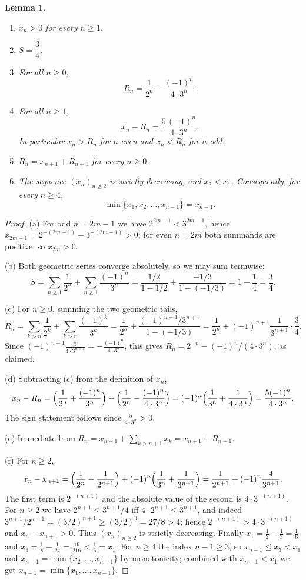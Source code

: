 \documentclass{amsart}
\newtheorem{lemma}{Lemma}
\theoremstyle{definition}
\begin{document}
\begin{lemma}\label{lem:setup}
\begin{enumerate}
\item[(a)] $x_n>0$ for every $n\ge1$.
\item[(b)] $S=\dfrac34$.
\item[(c)] For all $n\ge0$,
\[
  R_n=\frac{1}{2^n}-\frac{(-1)^n}{4\cdot3^n}.
\]
\item[(d)] For all $n\ge1$,
\[
  x_n-R_n=\frac{5\,(-1)^n}{4\cdot3^n}.
\]
In particular $x_n>R_n$ for $n$ even and $x_n<R_n$ for $n$ odd.
\item[(e)] $R_{n}=x_{n+1}+R_{n+1}$ for every $n\ge0$.
\item[(f)] The sequence $(x_n)_{n\ge2}$ is strictly decreasing, and $x_3<x_1$. Consequently, for
every $n\ge4$,
\[
  \min\{x_1,x_2,\dots,x_{n-1}\}=x_{n-1}.
\]
\end{enumerate}
\end{lemma}

\begin{proof}
(a) For odd $n=2m-1$ we have $2^{2m-1}<3^{2m-1}$, hence
$x_{2m-1}=2^{-(2m-1)}-3^{-(2m-1)}>0$; for even $n=2m$ both summands are positive, so $x_{2m}>0$.

(b) Both geometric series converge absolutely, so we may sum termwise:
\[
  S=\sum_{n\ge1}\frac1{2^n}+\sum_{n\ge1}\frac{(-1)^n}{3^n}
   =\frac{1/2}{1-1/2}+\frac{-1/3}{1-(-1/3)}
   =1-\frac14=\frac34 .
\]

(c) For $n\ge0$, summing the two geometric tails,
\[
  R_n=\sum_{k>n}\frac1{2^k}+\sum_{k>n}\frac{(-1)^k}{3^k}
     =\frac{1}{2^n}+\frac{(-1)^{n+1}/3^{n+1}}{1-(-1/3)}
     =\frac{1}{2^n}+(-1)^{n+1}\frac{1}{3^{n+1}}\cdot\frac34 .
\]
Since $(-1)^{n+1}\frac{3}{4\cdot3^{n+1}}=-\frac{(-1)^n}{4\cdot3^n}$, this gives
$R_n=2^{-n}-(-1)^n/(4\cdot3^n)$, as claimed.

(d) Subtracting (c) from the definition of $x_n$,
\[
  x_n-R_n=\Bigl(\frac1{2^n}+\frac{(-1)^n}{3^n}\Bigr)-\Bigl(\frac1{2^n}-\frac{(-1)^n}{4\cdot3^n}\Bigr)
        =(-1)^n\Bigl(\frac1{3^n}+\frac1{4\cdot3^n}\Bigr)
        =\frac{5(-1)^n}{4\cdot3^n}.
\]
The sign statement follows since $\tfrac{5}{4\cdot3^n}>0$.

(e) Immediate from $R_n=x_{n+1}+\sum_{k>n+1}x_k=x_{n+1}+R_{n+1}$.

(f) For $n\ge2$,
\[
  x_n-x_{n+1}=\Bigl(\frac1{2^n}-\frac1{2^{n+1}}\Bigr)+(-1)^n\Bigl(\frac1{3^n}+\frac1{3^{n+1}}\Bigr)
            =\frac1{2^{n+1}}+(-1)^n\frac{4}{3^{n+1}} .
\]
The first term is $2^{-(n+1)}$ and the absolute value of the second is $4\cdot3^{-(n+1)}$. For
$n\ge2$ we have $2^{n+1}\le 3^{n+1}/4$ iff $4\cdot2^{n+1}\le 3^{n+1}$, and indeed
$3^{n+1}/2^{n+1}=(3/2)^{n+1}\ge(3/2)^3=27/8>4$; hence $2^{-(n+1)}>4\cdot3^{-(n+1)}$ and
$x_n-x_{n+1}>0$. Thus $(x_n)_{n\ge2}$ is strictly decreasing.
Finally $x_1=\tfrac12-\tfrac13=\tfrac16$ and $x_3=\tfrac18-\tfrac1{27}=\tfrac{19}{216}<\tfrac16=x_1$.
For $n\ge4$ the index $n-1\ge3$, so $x_{n-1}\le x_3<x_1$ and $x_{n-1}=\min\{x_2,\dots,x_{n-1}\}$ by
monotonicity; combined with $x_{n-1}<x_1$ we get $x_{n-1}=\min\{x_1,\dots,x_{n-1}\}$.
\end{proof}
\end{document}
